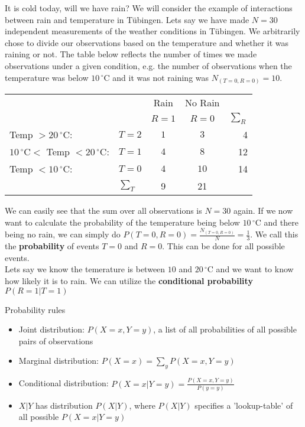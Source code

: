 \begin{exbox}{It is cold today, will we have rain?}
We will consider the example of interactions between rain and temperature in T\"ubingen. Lets say we have made $N = 30$ independent measurements of the weather conditions in T\"ubingen. We arbitrarily chose to divide our observations based on the temperature and whether it was raining or not. The table below reflects the number of times we made observations under a given condition, e.g. the number of observations when the temperature was below  $10\,^{\circ}\mathrm{C}$ and it was not raining was $N_{(T=0,R=0)} = 10$. \\
	\begin{tabular}{ll|c|c|r}
			& & Rain & No Rain \\
			& & $R = 1$ & $R = 0$ & $\sum_R$ \\ \hline
		Temp $> 20\,^{\circ}\mathrm{C}$: & $T = 2$ & $1$ & $3$ & 4\\ \hline
		$10\,^{\circ}\mathrm{C} <$ Temp $< 20\,^{\circ}\mathrm{C}$: & $T = 1$ & $4$ & $8$ & 12\\ \hline
		Temp $< 10\,^{\circ}\mathrm{C}$: & $T = 0$ & $4$ & $10$ & 14\\ \hline
			& $\sum_T$ & 9 & 21 \\
	\end{tabular}
We can easily see that the sum over all observations is $N = 30$ again. If we now want to calculate the probability of the temperature being below $10\,^{\circ}\mathrm{C}$ and there being no rain, we can simply do $P(T=0,R=0) = \frac{N_{(T=0,R=0)}}{N} = \frac{1}{3}$. We call this the \textbf{probability} of events $T=0$ and $R=0$. This can be done for all possible events.\\
Lets say we know the temerature is between $10$ and $20\,^{\circ}\mathrm{C}$ and we want to know how likely it is to rain. We can utilize the \textbf{conditional probability} $P(R=1|T=1)$
\end{exbox}

\begin{defbox}{Probability rules}
	\begin{itemize}
	\item {Joint distribution:} $P(X=x, Y=y)$, a list of all probabilities of all possible pairs of observations
	\item {Marginal distribution:} $P(X=x)=\sum_y P(X=x, Y=y) $
	\item {Conditional distribution:} $P(X=x|Y=y) = \frac{P(X=x, Y=y)}{P(y=y)}$
	\item $X |Y$ has distribution $P(X|Y)$, where $P(X|Y)$ specifies a 'lookup-table' of all possible $P(X=x| Y=y)$
	\end{itemize}
\end{defbox}

